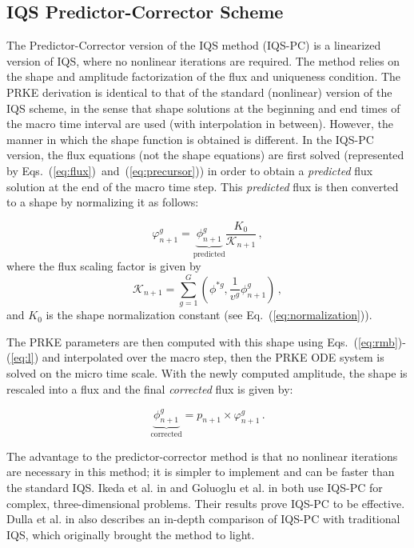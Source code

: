 \documentclass{elsarticle}
\newcommand{\eqt}[1]{Eq.~(\ref{#1})}                     %
\newcommand{\eqts}[2]{Eqs.~(\ref{#1})~and~(\ref{#2})}    %
\newcommand{\eqtss}[2]{Eqs.~(\ref{#1})-(\ref{#2})}       %
\newcommand{\iqspc}{IQS-PC\xspace}
\newcommand{\be}{\begin{equation}}
\newcommand{\ee}{\end{equation}}
\begin{document}
\subsection{IQS Predictor-Corrector Scheme}

The Predictor-Corrector version of the IQS method (\iqspc) is a linearized version of IQS, where no nonlinear iterations are required. The method relies on the shape and amplitude factorization of the flux and uniqueness condition. The PRKE derivation is identical to that of the standard (nonlinear) version of the IQS scheme, in the sense that shape solutions at the beginning and end times of the macro time interval are used (with interpolation in between). However, the manner in which the shape function is obtained is different.  In the \iqspc version, the flux equations (not the shape equations) are first solved (represented by \eqts{eq:flux}{eq:precursor}) in order to obtain a {\it predicted} flux solution at the end of the macro time step. This {\it predicted} flux is then converted to a shape by normalizing it as follows:

\be
\varphi^g_{n+1} = \underbrace{\phi^g_{n+1}}_{\text{predicted}} \frac{K_0}{\mathcal{K}_{n+1}} \,,
\label{eq:rescale}
\ee
where the flux scaling factor is given by
\be
\mathcal{K}_{n+1} =\sum_{g=1}^G\left(\phi^{*g},\frac{1}{v^g}\phi^g_{n+1}\right) \,,
\ee
and $K_0$ is the shape normalization constant (see \eqt{eq:normalization}).

The PRKE parameters are then computed with this shape using \eqtss{eq:rmb}{eq:l} and interpolated over the macro step, then the PRKE ODE system is solved on the micro time scale.  With the newly computed amplitude, the shape is rescaled into a flux and the final {\it corrected} flux is given by:

\be
\underbrace{\phi^g_{n+1}}_{\text{corrected}} = p_{n+1} \times \varphi^g_{n+1} \,.
\ee

The advantage to the predictor-corrector method is that no nonlinear iterations are necessary in this method; it is simpler to implement and can be faster than the standard IQS.  Ikeda et al. in \cite{Ikeda_2001} and Goluoglu et al. in \cite{Goluoglu_2001} 
both use \iqspc for complex, three-dimensional problems.  Their results prove \iqspc to be effective.  Dulla et al. in \cite{Dulla2008} also describes an in-depth comparison of \iqspc with traditional IQS, which originally brought the method to light.
\end{document}
